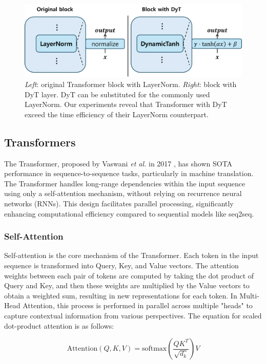 \documentclass{article}
\begin{document}
\begin{figure}
    \centering    \includegraphics[width=1\linewidth]{figure_dyt.png}
    \caption{\textit{Left}: original Transformer block with LayerNorm. \textit{Right}: block with DyT layer. DyT can be substituted for the commonly used LayerNorm. Our experiments reveal that Transformer with DyT exceed the time efficiency of their LayerNorm counterpart.}    \label{fig:layernorm_decoder}
\end{figure}

\subsection{Transformers}
The Transformer, proposed by Vaswani \textit{et al.} in 2017 \cite{vaswani2017attention}, has shown SOTA performance in sequence-to-sequence tasks, particularly in machine translation. The Transformer handles long-range dependencies within the input sequence using only a self-attention mechanism, without relying on recurrence neural networks (RNNs). This design facilitates parallel processing, significantly enhancing computational efficiency compared to sequential models like seq2seq. \cite{sutskever2014sequence}

\subsubsection{Self-Attention}

Self-attention is the core mechanism of the Transformer. Each token in the input sequence is transformed into Query, Key, and Value vectors. The attention weights between each pair of tokens are computed by taking the dot product of Query and Key, and then these weights are multiplied by the Value vectors to obtain a weighted sum, resulting in new representations for each token. In Multi-Head Attention, this process is performed in parallel across multiple "heads" to capture contextual information from various perspectives. The equation for scaled dot-product attention is as follows:

\begin{equation}
    \text{Attention}(Q, K, V) = \text{softmax}\left(\frac{QK^T}{\sqrt{d_k}}\right)V
\end{equation}
\end{document}
